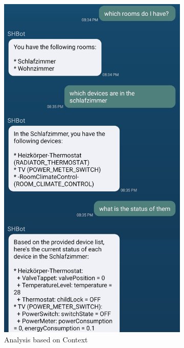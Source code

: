 \begin{figure}[htbp]
    \centering
    \begin{subfigure}{.4\textwidth}
        \includegraphics[width=\textwidth]{graphics/analysis-on-context.jpg}
        \caption{Analysis based on Context}
        \label{fig:analysis-on-context}
    \end{subfigure} 
    \hfill
    \begin{subfigure}{.44\textwidth}

\end{subfigure}
\end{figure}
